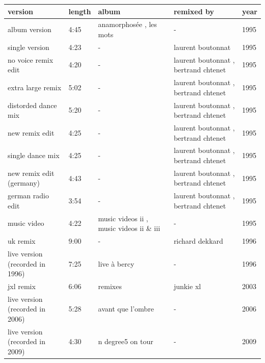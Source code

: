 \documentclass{article}
\begin{document}
\begin{tabular}{lllll}
\toprule
version & length & album & remixed by & year \\
\midrule
album version & 4:45 & anamorphosée , les mots & - & 1995 \\
single version & 4:23 & - & laurent boutonnat & 1995 \\
no voice remix edit & 4:20 & - & laurent boutonnat , bertrand chtenet & 1995 \\
extra large remix & 5:02 & - & laurent boutonnat , bertrand chtenet & 1995 \\
distorded dance mix & 5:20 & - & laurent boutonnat , bertrand chtenet & 1995 \\
new remix edit & 4:25 & - & laurent boutonnat , bertrand chtenet & 1995 \\
single dance mix & 4:25 & - & laurent boutonnat , bertrand chtenet & 1995 \\
new remix edit (germany) & 4:43 & - & laurent boutonnat , bertrand chtenet & 1995 \\
german radio edit & 3:54 & - & laurent boutonnat , bertrand chtenet & 1995 \\
music video & 4:22 & music videos ii , music videos ii \& iii & - & 1995 \\
uk remix & 9:00 & - & richard dekkard & 1996 \\
live version (recorded in 1996) & 7:25 & live à bercy & - & 1996 \\
jxl remix & 6:06 & remixes & junkie xl & 2003 \\
live version (recorded in 2006) & 5:28 & avant que l'ombre & - & 2006 \\
live version (recorded in 2009) & 4:30 & n degree5 on tour & - & 2009 \\
\bottomrule
\end{tabular}
\end{document}
